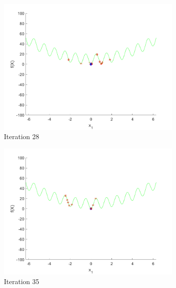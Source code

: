 \begin{figure}
\begin{subfigure}[b]{0.4\textwidth}
    \includegraphics[width=\textwidth]{img/smpl/rast1d/loa-iter-28}
    \caption{Iteration 28}
    \label{fig:s3-iter-4}
  \end{subfigure}
  \begin{subfigure}[b]{0.4\textwidth}
    \includegraphics[width=\textwidth]{img/smpl/rast1d/loa-iter-35}
    \caption{Iteration 35}
    \label{fig:s3-iter-5}
  \end{subfigure}
  \begin{subfigure}[b]{0.4\textwidth}

\end{subfigure}
\end{figure}

